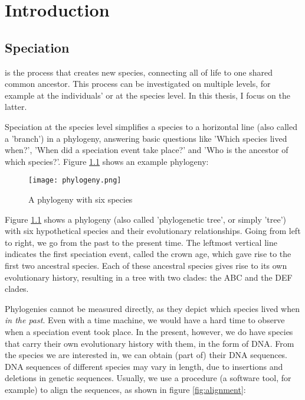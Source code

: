 \chapter{Introduction}
\label{chapter_introduction}

\newpage

\section{Speciation}

\noindent 
{} is the process that creates new species,
connecting all of life to one shared common ancestor. This process
can be investigated on multiple levels, for example at the individuals'
or at the species level. In this thesis, I focus on the latter.

Speciation at the species level simplifies a species to a horizontal 
line (also called a 'branch') in a phylogeny, answering
basic questions like 'Which species lived when?', 'When did a speciation 
event take place?' and 'Who is the ancestor of which species?'. 
Figure \ref{fig:phylogeny} shows an example phylogeny:

\begin{figure}[H]
  \texttt{[image: phylogeny.png]}
  \caption{
    A phylogeny with six species
  }
  \label{fig:phylogeny}
\end{figure}

Figure \ref{fig:phylogeny} shows a phylogeny (also called 'phylogenetic tree', 
or simply 'tree') with six hypothetical species and their evolutionary 
relationships. Going from left to right, we go from the past to the present 
time. The leftmost vertical line indicates the first speciation event, called
the crown age, which gave rise to the first two ancestral species. Each
of these ancestral species gives rise to its own evolutionary history,
resulting in a tree with two clades: the ABC and the DEF clades.

Phylogenies cannot be measured directly, as they depict which species lived
when \emph{in the past}. Even with a time machine, we would have a hard time
to observe when a speciation event took place. In the present, however, we
do have species that carry their own evolutionary history with them, in the
form of DNA. From the species we are interested in, 
we can obtain (part of) their DNA sequences. DNA sequences of different species 
may vary in length, due to insertions and deletions in genetic sequences.
Usually, we use a procedure (a software tool, for example) to align 
the sequences, as shown in figure \ref{fig:alignment}:

